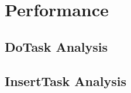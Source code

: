 \def\CTeXPreproc{Created by ctex v0.2.14, don't edit!}
\section{Performance}
\subsection{DoTask Analysis}
\subsection{InsertTask Analysis}
